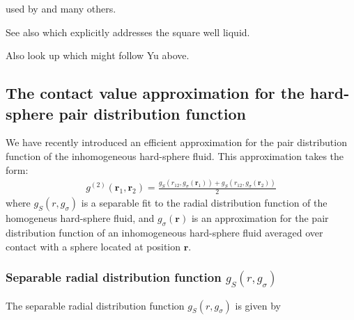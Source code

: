 \documentclass[letterpaper,twocolumn,amsmath,amssymb,pre,aps,10pt]{revtex4-1}
\newcommand\rr{\mathbf{r}}
\begin{document}
\cite{peng2008meanfield} used by
\cite{sundararaman2013efficient} and many others.

See also \cite{yu2009novel} which explicitly addresses the square well
liquid.

Also look up \cite{shen2013hybrid} which might follow Yu above.

\subsection{The contact value approximation for the hard-sphere pair distribution function}

We have recently introduced an efficient approximation for the pair
distribution function of the inhomogeneous hard-sphere fluid.  This
approximation takes the form:
\begin{align}
  g^{(2)}(\rr_1,\rr_2) = \frac{g_S(r_{12}, g_\sigma(\rr_1)) +
    g_S(r_{12}, g_\sigma(\rr_2))}{2} \label{eq:g2-our-mean}
\end{align}
where $g_S(r,g_\sigma)$ is a separable fit to the radial distribution
function of the homogeneus hard-sphere fluid, and $g_\sigma(\rr)$ is
an approximation for the pair distribution function of an
inhomogeneous hard-sphere fluid averaged over contact with a sphere
located at position $\rr$.

\subsubsection{Separable radial distribution function
  $g_S(r,g_\sigma)$}

The separable radial distribution function $g_S(r,g_\sigma)$ is given
by
\newcommand\kappaO{\kappa_0}
\newcommand\kappaI{\kappa_1}
\newcommand\kappaZ{\kappa_2}
\newcommand\kappazero{3.68}
\newcommand\kappaone{2.16}
\newcommand\kappatwo{2.79}
\end{document}
